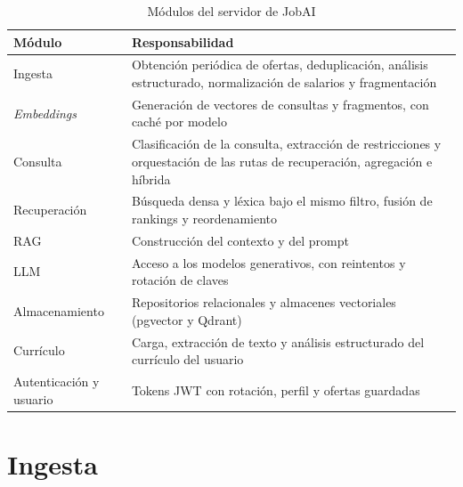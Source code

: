 \begin{table}[htbp!]
    \centering
    \caption{Módulos del servidor de JobAI}
    \label{tab:art-modulos}
    \begin{tabular}{|p{3.2cm}|p{11cm}|}
        \hline
        \textbf{Módulo} & \textbf{Responsabilidad} \\
        \hline
        Ingesta & Obtención periódica de ofertas, deduplicación, análisis estructurado, normalización de salarios y fragmentación \\
        \hline
        \textit{Embeddings} & Generación de vectores de consultas y fragmentos, con caché por modelo \\
        \hline
        Consulta & Clasificación de la consulta, extracción de restricciones y orquestación de las rutas de recuperación, agregación e híbrida \\
        \hline
        Recuperación & Búsqueda densa y léxica bajo el mismo filtro, fusión de rankings y reordenamiento \\
        \hline
        RAG & Construcción del contexto y del prompt \\
        \hline
        LLM & Acceso a los modelos generativos, con reintentos y rotación de claves \\
        \hline
        Almacenamiento & Repositorios relacionales y almacenes vectoriales (pgvector y Qdrant) \\
        \hline
        Currículo & Carga, extracción de texto y análisis estructurado del currículo del usuario \\
        \hline
        Autenticación y usuario & Tokens JWT con rotación, perfil y ofertas guardadas \\
        \hline
    \end{tabular}
\end{table}

\section{Ingesta}

